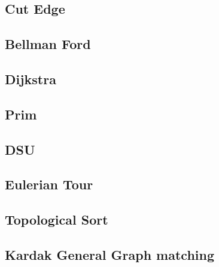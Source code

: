 \documentclass[a4paper,landscape]{article}
\begin{document}
\begin{multicols}{2}
\subsection{Cut Edge}
	
\subsection{Bellman Ford}
	
\subsection{Dijkstra}
	
\subsection{Prim}
	
\subsection{DSU}
	
\subsection{Eulerian Tour}
	
\subsection{Topological Sort}
	
\subsection{Kardak General Graph matching}
	

\end{multicols}
\end{document}
